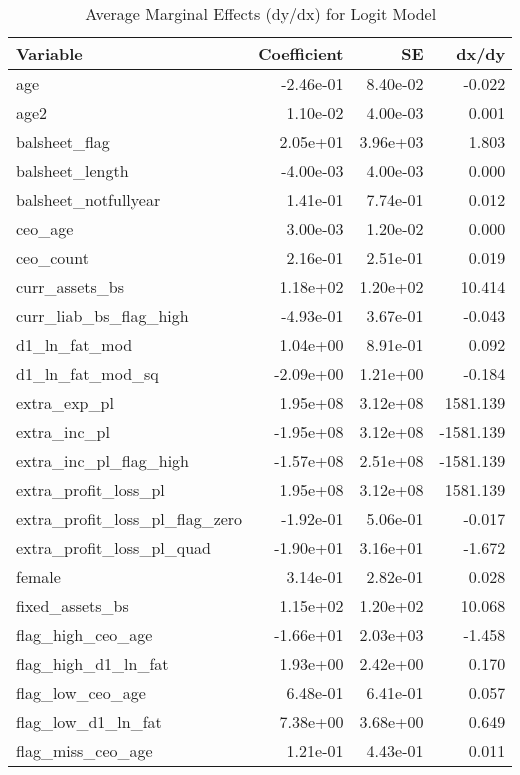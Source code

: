 \begin{table}

\caption{Average Marginal Effects (dy/dx) for Logit Model}
\centering
\begin{tabular}[t]{l|r|r|r}
\hline
Variable & Coefficient & SE & dx/dy\\
\hline
age & -2.46e-01 & 8.40e-02 & -0.022\\
\hline
age2 & 1.10e-02 & 4.00e-03 & 0.001\\
\hline
balsheet\_flag & 2.05e+01 & 3.96e+03 & 1.803\\
\hline
balsheet\_length & -4.00e-03 & 4.00e-03 & 0.000\\
\hline
balsheet\_notfullyear & 1.41e-01 & 7.74e-01 & 0.012\\
\hline
ceo\_age & 3.00e-03 & 1.20e-02 & 0.000\\
\hline
ceo\_count & 2.16e-01 & 2.51e-01 & 0.019\\
\hline
curr\_assets\_bs & 1.18e+02 & 1.20e+02 & 10.414\\
\hline
curr\_liab\_bs\_flag\_high & -4.93e-01 & 3.67e-01 & -0.043\\
\hline
d1\_ln\_fat\_mod & 1.04e+00 & 8.91e-01 & 0.092\\
\hline
d1\_ln\_fat\_mod\_sq & -2.09e+00 & 1.21e+00 & -0.184\\
\hline
extra\_exp\_pl & 1.95e+08 & 3.12e+08 & 1581.139\\
\hline
extra\_inc\_pl & -1.95e+08 & 3.12e+08 & -1581.139\\
\hline
extra\_inc\_pl\_flag\_high & -1.57e+08 & 2.51e+08 & -1581.139\\
\hline
extra\_profit\_loss\_pl & 1.95e+08 & 3.12e+08 & 1581.139\\
\hline
extra\_profit\_loss\_pl\_flag\_zero & -1.92e-01 & 5.06e-01 & -0.017\\
\hline
extra\_profit\_loss\_pl\_quad & -1.90e+01 & 3.16e+01 & -1.672\\
\hline
female & 3.14e-01 & 2.82e-01 & 0.028\\
\hline
fixed\_assets\_bs & 1.15e+02 & 1.20e+02 & 10.068\\
\hline
flag\_high\_ceo\_age & -1.66e+01 & 2.03e+03 & -1.458\\
\hline
flag\_high\_d1\_ln\_fat & 1.93e+00 & 2.42e+00 & 0.170\\
\hline
flag\_low\_ceo\_age & 6.48e-01 & 6.41e-01 & 0.057\\
\hline
flag\_low\_d1\_ln\_fat & 7.38e+00 & 3.68e+00 & 0.649\\
\hline
flag\_miss\_ceo\_age & 1.21e-01 & 4.43e-01 & 0.011\\

\end{tabular}
\end{table}
